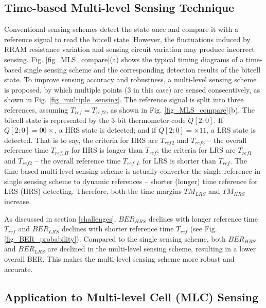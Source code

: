 \subsection{Time-based Multi-level Sensing Technique}
Conventional sensing schemes detect the state once and compare it with a reference signal to read the bitcell state. However, the fluctuations induced by RRAM resistance variation and sensing circuit variation may produce incorrect sensing. 
Fig. \ref{fig_MLS_compare}(a) shows the typical timing diagrams of a time-based single sensing scheme and the corresponding detection results of the bitcell state. 
To improve sensing accuracy and robustness, a multi-level sensing scheme is proposed, by which multiple points (3 in this case) are sensed consecutively, as shown in Fig. \ref{fig_multiple_sensing}.  
The reference signal is split into three references, assuming $T_{ref}=T_{ref2}$, as shown in Fig. \ref{fig_MLS_compare}(b). The bitcell state is represented by the 3-bit thermometer code $Q[2:0]$. If $Q[2:0]=00\times$, a HRS state is detected; and if $Q[2:0]=\times11$, a LRS state is detected. That is to say, the criteria for HRS are $T_{ref2}$ and $T_{ref3}$ -- the overall reference time $T_{ref,H}$ for HRS is longer than $T_{ref}$; the criteria for LRS are $T_{ref1}$ and $T_{ref2}$ -- the overall reference time $T_{ref,L}$ for LRS is shorter than $T_{ref}$. The time-based multi-level sensing scheme is actually converter the single reference in single sensing scheme to dynamic references -- shorter (longer) time reference for LRS (HRS) detecting. Therefore, both the time margins $TM_{LRS}$ and $TM_{HRS}$ increase. 

As discussed in section \ref{challenges}, $BER_{HRS}$ declines with longer reference time $T_{ref}$ and $BER_{LRS}$ declines with shorter reference time $T_{ref}$ (see  Fig. \ref{fig_BER_probability}). 
Compared to the single sensing scheme, both $BER_{HRS}$ and $BER_{LRS}$ are declined in the multi-level sensing scheme, resulting in a lower overall BER. This makes the multi-level sensing scheme more robust and accurate. 


\subsection{Application to Multi-level Cell (MLC) Sensing}

